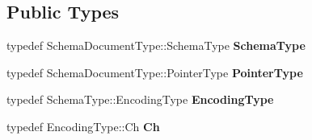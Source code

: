 \subsection*{Public Types}
\begin{DoxyCompactItemize}
\item 
\mbox{\label{classGenericSchemaValidator_ac79628f00f6720bbabb70b44f0d076a0}} 
typedef Schema\+Document\+Type\+::\+Schema\+Type {\bfseries Schema\+Type}
\item 
\mbox{\label{classGenericSchemaValidator_ae0c6c9a9c0ff6bae80e75c6705f2668b}} 
typedef Schema\+Document\+Type\+::\+Pointer\+Type {\bfseries Pointer\+Type}
\item 
\mbox{\label{classGenericSchemaValidator_acf1c5361bb96da87d23167d8720b1ea5}} 
typedef Schema\+Type\+::\+Encoding\+Type {\bfseries Encoding\+Type}
\item 
\mbox{\label{classGenericSchemaValidator_a8b7dab5a0cda9cc0adaefb4401d260c1}} 
typedef Encoding\+Type\+::\+Ch {\bfseries Ch}
\end{DoxyCompactItemize}
